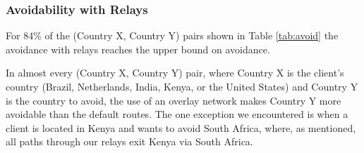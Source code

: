 

\subsubsection{Avoidability with Relays}
\begin{finding}
For 84\% of the (Country X, Country Y) pairs shown in Table \ref{tab:avoid} the avoidance with relays reaches the upper bound on avoidance. 
\end{finding}
\noindent
In almost every (Country X, Country Y) pair, where Country X is the
client's country (Brazil, Netherlands, India, Kenya, or the United
States) and Country Y is the country to avoid, the use of an overlay
network makes Country Y more avoidable than the default routes.  The one
exception we encountered is when a client is located in Kenya and wants
to avoid South Africa, where, as mentioned, all paths through our
relays exit Kenya via South Africa.

